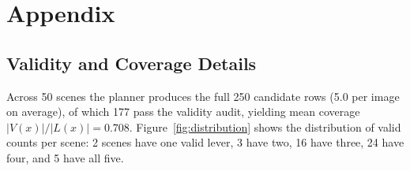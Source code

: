 \newpage
\section{Appendix}

\subsection{Validity and Coverage Details}
\label{sec:validity_appendix}

Across 50 scenes the planner produces the full 250 candidate rows
(5.0 per image on average), of which 177 pass the validity audit,
yielding mean coverage $|V(x)|/|L(x)| = 0.708$.
Figure~\ref{fig:distribution} shows the distribution of valid counts per
scene: 2 scenes have one valid lever, 3 have two, 16 have three,
24 have four, and 5 have all five.

\begin{table}[t]
  \centering
  \caption{Family-level summary over the full $N{=}50$ run.
  Valid-rate intervals are 95\% Wilson confidence intervals; mean
  $\Delta_{\mathrm{aux}}$ and $\Delta_{\mathrm{aux}}$ [95\% CI] are
  computed over valid edits only.}
  \label{tab:family_appendix}
  \scriptsize
\end{table}

